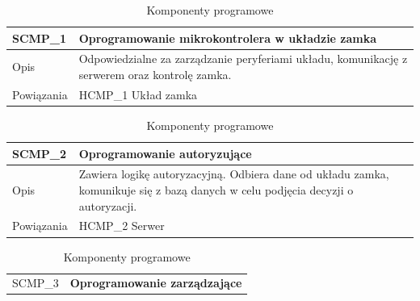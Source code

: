                 \begin{table}
                    \caption{Komponenty programowe}
                    \centering
                    \begin{subtable}[c]{\textwidth}
                        \centering
                        \begin{tabular}{|p{2cm}|p{12cm}|}
                            \hline SCMP\_1      & \textbf{Oprogramowanie mikrokontrolera w układzie zamka} \\
                            \hline \cellcolor[gray]{0.8} Opis         & Odpowiedzialne za zarządzanie peryferiami układu, komunikację z serwerem oraz kontrolę zamka.  \\
                            \hline \cellcolor[gray]{0.8} Powiązania   & HCMP\_1 Układ zamka    \\
                            \hline
                        \end{tabular}
                        \label{tbl:scmp1}
                        \vspace{10mm}           
                    \end{subtable}
                \quad%
                    \begin{subtable}[c]{\textwidth}
                        \centering
                        \begin{tabular}{|p{2cm}|p{12cm}|}
                            \hline SCMP\_2      & \textbf{Oprogramowanie autoryzujące} \\
                            \hline \cellcolor[gray]{0.8} Opis         & Zawiera logikę autoryzacyjną. Odbiera dane od układu zamka, komunikuje się z bazą danych w celu podjęcia decyzji o autoryzacji. \\
                            \hline \cellcolor[gray]{0.8} Powiązania   & HCMP\_2 Serwer    \\
                            \hline
                        \end{tabular}
                        \label{tbl:scmp2}
                        \vspace{10mm}           
                    \end{subtable}
                \quad%
                    \begin{subtable}[c]{\textwidth}
                        \centering
                        \begin{tabular}{|p{2cm}|p{12cm}|}
                            \hline SCMP\_3      & \textbf{Oprogramowanie zarządzające} \\

\end{tabular}
\end{subtable}
\end{table}
